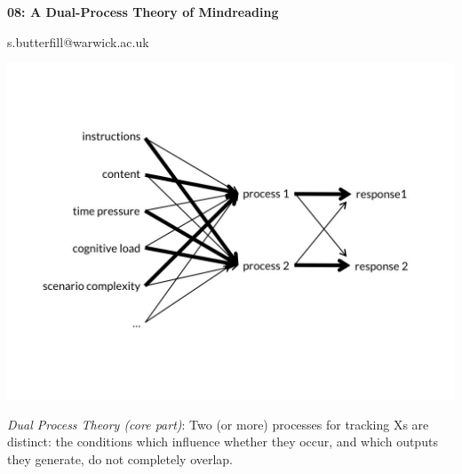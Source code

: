 \documentclass[12pt]{extarticle}
\date{}
\makeatletter
\def \ititle {Philosophical Psychology}
\def \iemail{s.butterfill@warwick.ac.uk}
\makeatother
\begin{document}
\begin{multicols*}{3}

\setlength\footnotesep{1em}











\def \ititle {08: A Dual-Process Theory of Mindreading}

\begin{center}

{\Large

\textbf{\ititle}

}



\iemail %

\end{center}

\begin{center}
\includegraphics[scale=0.3]{img/dual_process_operationalized_11.neg.jpg}
\end{center}

\emph{Dual Process Theory (core part)}:
Two (or more) processes for tracking Xs are distinct:
the conditions which influence whether they occur,
and which outputs they generate,
do not completely overlap.


\footnotesize
% 

\end{multicols*}
\end{document}
